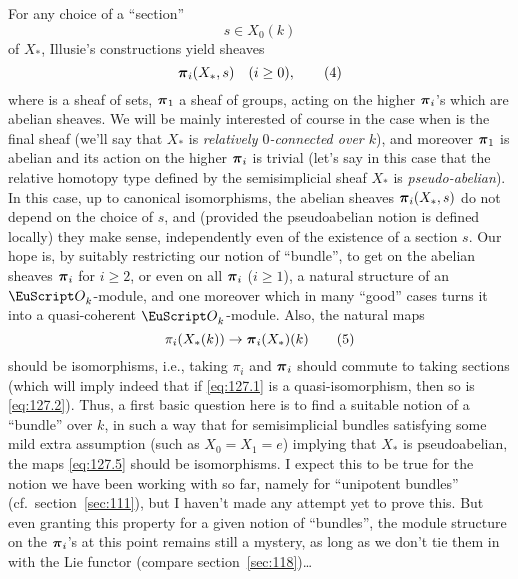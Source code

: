 For any choice of a ``section''
\begin{equation}
  \label{eq:127.3}
  s\in X_0(k)\tag{3}
\end{equation}
of $X_*$, Illusie's constructions yield sheaves
\begin{equation}
  \label{eq:127.4}
  {\ensuremath{\boldsymbol\pi}}_i(X_*,s)\quad
  (i\ge0),\tag{4}
\end{equation}
where \bpiz{} is a sheaf of sets, ${\boldsymbol\pi}_1$ a sheaf of groups, acting
on the higher ${\boldsymbol\pi}_i$'s which are abelian sheaves. We will be mainly
interested of course in the case when \bpiz{} is the final sheaf
(we'll say that $X_*$ is \emph{relatively $0$-connected over $k$}),
and moreover ${\boldsymbol\pi}_1$ is abelian and its action on the higher ${\boldsymbol\pi}_i$
is trivial (let's say in this case that the relative homotopy type
defined by the semisimplicial sheaf $X_*$ is
\emph{pseudo-abelian}). In this case, up to canonical isomorphisms,
the abelian sheaves ${\boldsymbol\pi}_i(X_*,s)$ do not depend on the choice of
$s$, and (provided the pseudoabelian notion is defined locally) they
make sense, independently even of the existence of a section $s$. Our
hope is, by suitably restricting our notion of ``bundle'', to get on
the abelian sheaves ${\boldsymbol\pi}_i$ for $i\ge2$, or even on all ${\boldsymbol\pi}_i$
($i\ge1$), a natural structure of an $\scrO_k$-module, and one
moreover which in many ``good'' cases turns it into a quasi-coherent
$\scrO_k$-module. Also, the natural maps
\begin{equation}
  \label{eq:127.5}
  \pi_i(X_*(k)) \to {\ensuremath{\boldsymbol\pi}}_i(X_*)(k)\tag{5}
\end{equation}
should be isomorphisms, i.e., taking $\pi_i$ and ${\boldsymbol\pi}_i$ should
commute to taking sections (which will imply indeed that if
\eqref{eq:127.1} is a quasi-isomorphism, then so is
\eqref{eq:127.2}). Thus, a first basic question here is to find a
suitable notion of a ``bundle'' over $k$, in such a way that for
semisimplicial bundles satisfying some mild extra assumption (such as
$X_0=X_1=e$) implying that $X_*$ is pseudoabelian, the maps
\eqref{eq:127.5} should be isomorphisms. I expect this to be true for
the notion we have been working with so far, namely for ``unipotent
bundles'' (cf.\ section~\ref{sec:111}), but I haven't made any attempt
yet to prove this. But even granting this property for a given notion
of ``bundles'', the module structure on the ${\boldsymbol\pi}_i$'s at this point
remains still a mystery, as long as we don't tie them in with the Lie
functor (compare section~\ref{sec:118})\dots

